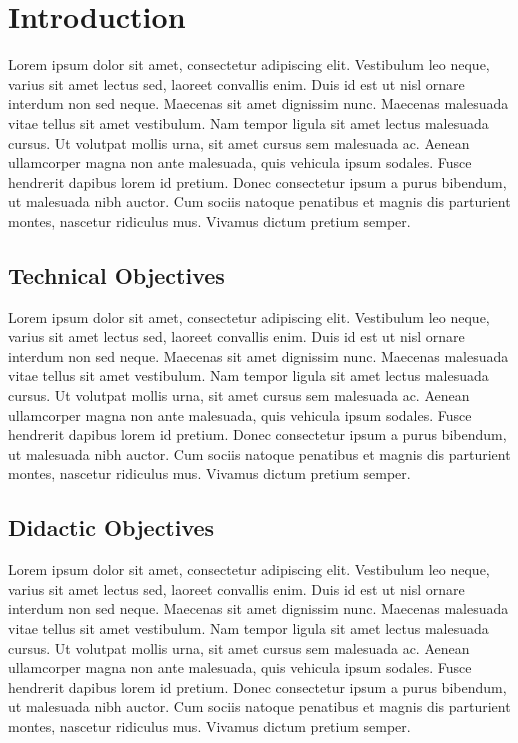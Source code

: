 \documentclass[12pt,twoside,openright,english,spanish]{toptesi}
\begin{document}
\frontmatter
\tableofcontents
\listoffigures 
\listoftables
\newpage
\thispagestyle{empty}
\mbox{}
\pagebreak

\mainmatter

\chapter{Introduction}
Lorem ipsum dolor sit amet, consectetur adipiscing elit. Vestibulum leo neque, varius sit amet lectus sed, laoreet convallis enim. Duis id est ut nisl ornare interdum non sed neque. Maecenas sit amet dignissim nunc. Maecenas malesuada vitae tellus sit amet vestibulum. Nam tempor ligula sit amet lectus malesuada cursus. Ut volutpat mollis urna, sit amet cursus sem malesuada ac. Aenean ullamcorper magna non ante malesuada, quis vehicula ipsum sodales. Fusce hendrerit dapibus lorem id pretium. Donec consectetur ipsum a purus bibendum, ut malesuada nibh auctor. Cum sociis natoque penatibus et magnis dis parturient montes, nascetur ridiculus mus. Vivamus dictum pretium semper.


\section{Technical Objectives}
Lorem ipsum dolor sit amet, consectetur adipiscing elit. Vestibulum leo neque, varius sit amet lectus sed, laoreet convallis enim. Duis id est ut nisl ornare interdum non sed neque. Maecenas sit amet dignissim nunc. Maecenas malesuada vitae tellus sit amet vestibulum. Nam tempor ligula sit amet lectus malesuada cursus. Ut volutpat mollis urna, sit amet cursus sem malesuada ac. Aenean ullamcorper magna non ante malesuada, quis vehicula ipsum sodales. Fusce hendrerit dapibus lorem id pretium. Donec consectetur ipsum a purus bibendum, ut malesuada nibh auctor. Cum sociis natoque penatibus et magnis dis parturient montes, nascetur ridiculus mus. Vivamus dictum pretium semper.


\section{Didactic Objectives}
Lorem ipsum dolor sit amet, consectetur adipiscing elit. Vestibulum leo neque, varius sit amet lectus sed, laoreet convallis enim. Duis id est ut nisl ornare interdum non sed neque. Maecenas sit amet dignissim nunc. Maecenas malesuada vitae tellus sit amet vestibulum. Nam tempor ligula sit amet lectus malesuada cursus. Ut volutpat mollis urna, sit amet cursus sem malesuada ac. Aenean ullamcorper magna non ante malesuada, quis vehicula ipsum sodales. Fusce hendrerit dapibus lorem id pretium. Donec consectetur ipsum a purus bibendum, ut malesuada nibh auctor. Cum sociis natoque penatibus et magnis dis parturient montes, nascetur ridiculus mus. Vivamus dictum pretium semper.
\end{document}
